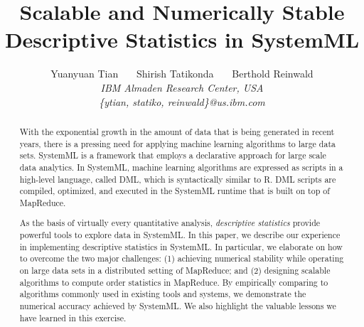 \documentclass[10pt,conference,letterpaper]{IEEEtran}
\begin{document}
%
\title{Scalable and Numerically Stable Descriptive Statistics in SystemML}
\author{Yuanyuan Tian \ \ \  Shirish Tatikonda \ \ \  Berthold Reinwald
%
\vspace{1.6mm}\\
\fontsize{10}{10}\selectfont\itshape
\fontsize{10}{10}\selectfont\rmfamily\itshape
IBM Almaden Research Center, USA\\
\fontsize{9}{9}\selectfont\ttfamily\upshape
\{ytian, statiko, reinwald\}@us.ibm.com
}%
\maketitle
\begin{abstract}
With the exponential growth in the amount of data that is being generated in recent years, there is a pressing need for applying machine learning algorithms to large data sets. SystemML is a framework that employs a declarative approach for large scale data analytics. 
In SystemML, machine learning algorithms are expressed as scripts in a high-level language, called DML, which is syntactically similar to R. DML scripts are compiled, optimized, and executed in the SystemML runtime that is built on top of MapReduce. 


As the basis of virtually every quantitative analysis, {\em descriptive statistics} provide powerful tools to explore data in SystemML. In this paper, we describe our experience in implementing descriptive statistics in SystemML. In particular, we elaborate on how to overcome the two major challenges: (1) achieving numerical stability while operating on large data sets in a distributed setting of MapReduce; and (2) designing scalable algorithms to compute order statistics in MapReduce. By empirically comparing to algorithms commonly used in existing tools and systems, we demonstrate the numerical accuracy achieved by SystemML. We also highlight the valuable lessons we have learned in this exercise.



\end{abstract}
\end{document}

